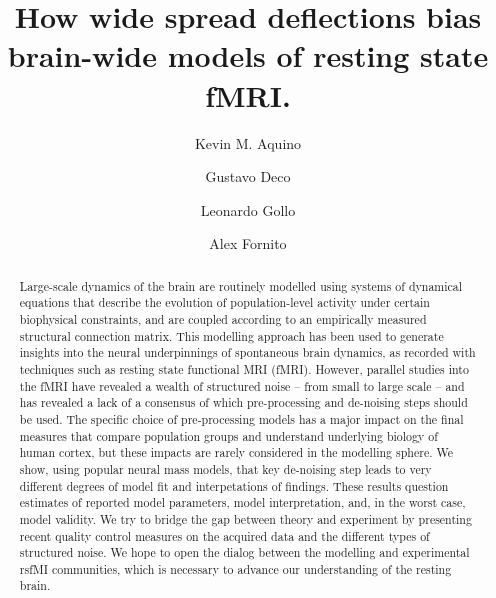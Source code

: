 \documentclass[oneside]{zHenriquesLab-StyleBioRxiv}
\begin{document}
\title{How wide spread deflections bias brain-wide models of resting state fMRI.}

\author[1,*]{Kevin M. Aquino}
\author[1,2]{Gustavo Deco}
\author[1]{Leonardo Gollo}
\author[1]{Alex Fornito}



\maketitle

\begin{abstract}
Large-scale dynamics of the brain are routinely modelled using systems of dynamical equations that describe the evolution of population-level activity under certain biophysical constraints, and are coupled according to an empirically measured structural connection matrix. This modelling approach has been used to generate insights into the neural underpinnings of spontaneous brain dynamics, as recorded with techniques such as resting state functional MRI (fMRI).
However, parallel studies into the fMRI have revealed a wealth of structured noise – from small to large scale – and has revealed a lack of a consensus of which pre-processing and de-noising steps should be used. 
The specific choice of pre-processing models has a major impact on the final measures that compare population groups and understand underlying biology of human cortex, but these impacts are rarely considered in the modelling sphere. 
We show, using popular neural mass models, that key de-noising step leads to very different degrees of model fit and interpetations of findings.
These results question estimates of reported model parameters, model interpretation, and, in the worst case, model validity. 
We try to bridge the gap between theory and experiment by presenting recent quality control measures on the acquired data and the different types of structured noise. 
We hope to open the dialog between the modelling and experimental rsfMI communities, which is necessary to advance our understanding of the resting brain.
\end{abstract}
\end{document}
